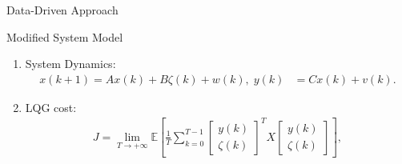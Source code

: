 \documentclass[10pt]{beamer}
\newcommand{\tikzdir}[1]{#1.tikz}
\newcommand{\inputtikz}[1]{}}
\begin{document}
\begin{frame}{Data-Driven Approach}
  \begin{figure}[htpb]
    \inputtikz{systemdiagram2}
  \end{figure}
\end{frame}

\begin{frame}{Modified System Model}
  \begin{figure}
    \centering
  \end{figure}
  \begin{enumerate}
    \item System Dynamics:
      \begin{align*}
	x(k+1) = A x(k) + B\zeta(k)+w(k), \;y(k)  &= C x(k) + v(k) . 
      \end{align*}
    \item LQG cost:
      \begin{align*}
	J = \lim_{T \to +\infty} \mathbb E\left [\frac{1}{T}\sum_{k=0}^{T-1} \begin{bmatrix}
	    y(k)\\
	    \zeta(k)
	    \end{bmatrix}^TX \begin{bmatrix}
	    y(k)\\
	    \zeta(k)
	\end{bmatrix} \right ],
      \end{align*}
  \end{enumerate}
\end{frame}
\end{document}

